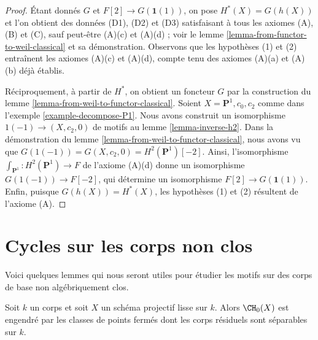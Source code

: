 \begin{proof}
Étant donnés $G$ et $F[2] \to G(\mathbf{1}(1))$, on pose $H^*(X) = G(h(X))$
et l'on obtient des données (D1), (D2) et (D3) satisfaisant à tous les axiomes (A), (B) et (C),
sauf peut-être (A)(c) et (A)(d) ; voir
le lemme \ref{lemma-from-functor-to-weil-classical} et sa démonstration.
Observons que les hypothèses (1) et (2) entraînent les axiomes (A)(c) et (A)(d),
compte tenu des axiomes (A)(a) et (A)(b) déjà établis.

\medskip\noindent
Réciproquement, à partir de $H^*$, on obtient un foncteur $G$ par la construction du
lemme \ref{lemma-from-weil-to-functor-classical}.
Soient $X = \mathbf{P}^1, c_0, c_2$ comme dans l'exemple \ref{example-decompose-P1}.
Nous avons construit un isomorphisme $1(-1) \to (X, c_2, 0)$ de motifs au
lemme \ref{lemma-inverse-h2}. Dans la démonstration du
lemme \ref{lemma-from-weil-to-functor-classical}, nous avons vu que
$G(1(-1)) = G(X, c_2, 0) = H^2(\mathbf{P}^1)[-2]$.
Ainsi, l'isomorphisme $\int_{\mathbf{P}^1} : H^2(\mathbf{P}^1) \to F$
de l'axiome (A)(d) donne un isomorphisme $G(1(-1)) \to F[-2]$,
qui détermine un isomorphisme $F[2] \to G(\mathbf{1}(1))$.
Enfin, puisque $G(h(X)) = H^*(X)$, les hypothèses (1) et (2)
résultent de l'axiome (A).
\end{proof}











\section{Cycles sur les corps non clos}
\label{section-cycles-nonclosed}

\noindent
Voici quelques lemmes qui nous seront utiles pour étudier les motifs
sur des corps de base non algébriquement clos.

\begin{lemma}
\label{lemma-generated-by-separable}
Soit $k$ un corps et soit $X$ un schéma projectif lisse sur $k$.
Alors $\CH_0(X)$ est engendré par les classes de points fermés dont les corps
résiduels sont séparables sur $k$.
\end{lemma}

